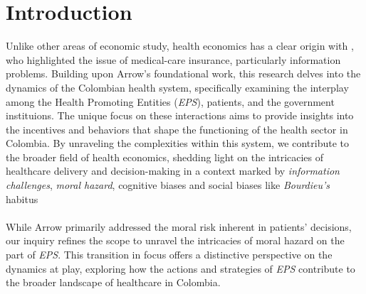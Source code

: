 \documentclass[12pt]{article}
\begin{document}
\section*{Introduction}
\begin{flushleft}
    Unlike other areas of economic study, health economics has a clear origin with \citet{arrow1963uncertainty}, who highlighted the issue of medical-care insurance, particularly information problems. Building upon Arrow's foundational work, this research delves into the dynamics of the Colombian health system, specifically examining the interplay among the Health Promoting Entities (\textit{EPS}), patients, and the government instituions. The unique focus on these interactions aims to provide insights into the incentives and behaviors that shape the functioning of the health sector in Colombia. By unraveling the complexities within this system, we contribute to the broader field of health economics, shedding light on the intricacies of healthcare delivery and decision-making in a context marked by \textit{information challenges}, \textit{moral hazard}, cognitive biases and social biases like \textit{Bourdieu's} habitus\\~\\

    While Arrow primarily addressed the moral risk inherent in patients' decisions, our inquiry refines the scope to unravel the intricacies of moral hazard on the part of \textit{EPS}. This transition in focus offers a distinctive perspective on the dynamics at play, exploring how the actions and strategies of \textit{EPS} contribute to the broader landscape of healthcare in Colombia.\par~\par
    

\end{flushleft}
\end{document}
